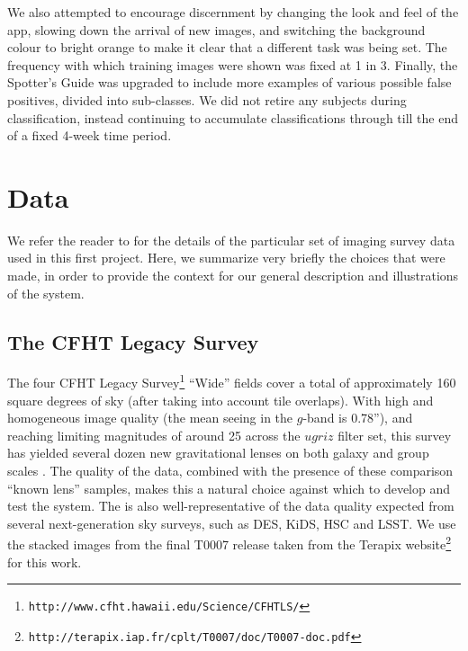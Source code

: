 \documentclass[useAMS,usenatbib,a4paper]{mn2e}
\begin{document}
We also attempted to encourage discernment by changing the look and feel of the
app, slowing down the arrival of new images, and switching the background colour
to bright orange to make it clear that a different task was being set. The
frequency with which training images were shown was fixed at 1 in 3. Finally,
the Spotter's Guide was upgraded to include more examples of various possible
false positives, divided into sub-classes. We did not retire any subjects during
\StageTwo classification, instead continuing to accumulate classifications
through till the end of a fixed 4-week time period.



\section{Data}
\label{sec:data}

We refer the reader to \PaperTwo for the details of the particular set of
imaging survey data used in this first \SW project. Here, we summarize very
briefly the choices that were made, in order to provide the context for our
general description and illustrations of the \SW system.


\subsection{The CFHT Legacy Survey}
\label{sec:data:CFHTLS}

The four CFHT Legacy Survey\footnote{\texttt{http://www.cfht.hawaii.edu/Science/CFHTLS/}}
\citep[\cfhtls,][]{Gwyn2012} ``Wide'' fields cover a total of approximately
160 square degrees of sky (after taking into account tile overlaps).
With high and homogeneous image quality (the mean seeing in the $g$-band is
0.78''), and reaching limiting magnitudes of around 25 across the $ugriz$ filter
set, this survey has yielded several dozen new gravitational lenses on both
galaxy and group scales
\citep{GavazziEtal2014,SonnenfeldEtal2013a,CabanacEtal2007,MoreEtal2012}. The
quality of the data, combined with the presence of these comparison ``known
lens'' samples, makes this a natural choice against which to develop and test
the \SW system. The \cfhtls is also well-representative of the data quality
expected from several next-generation sky surveys, such as DES, KiDS, HSC and
LSST. We use the stacked images
from the final T0007 release taken from the Terapix
website\footnote{\texttt{http://terapix.iap.fr/cplt/T0007/doc/T0007-doc.pdf}} for this
work.
\end{document}
